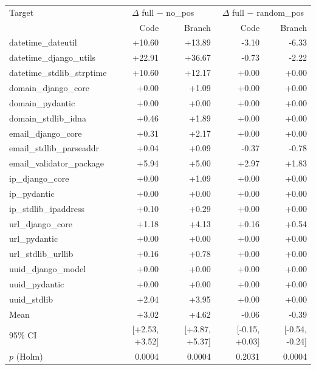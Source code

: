 \begin{tabular}{lrrrr}
\toprule
Target & \multicolumn{2}{c}{$\Delta$ full $-$ no\_pos} & \multicolumn{2}{c}{$\Delta$ full $-$ random\_pos} \\
 & Code & Branch & Code & Branch \\
\midrule
datetime\_dateutil & +10.60 & +13.89 & -3.10 & -6.33 \\
datetime\_django\_utils & +22.91 & +36.67 & -0.73 & -2.22 \\
datetime\_stdlib\_strptime & +10.60 & +12.17 & +0.00 & +0.00 \\
domain\_django\_core & +0.00 & +1.09 & +0.00 & +0.00 \\
domain\_pydantic & +0.00 & +0.00 & +0.00 & +0.00 \\
domain\_stdlib\_idna & +0.46 & +1.89 & +0.00 & +0.00 \\
email\_django\_core & +0.31 & +2.17 & +0.00 & +0.00 \\
email\_stdlib\_parseaddr & +0.04 & +0.09 & -0.37 & -0.78 \\
email\_validator\_package & +5.94 & +5.00 & +2.97 & +1.83 \\
ip\_django\_core & +0.00 & +1.09 & +0.00 & +0.00 \\
ip\_pydantic & +0.00 & +0.00 & +0.00 & +0.00 \\
ip\_stdlib\_ipaddress & +0.10 & +0.29 & +0.00 & +0.00 \\
url\_django\_core & +1.18 & +4.13 & +0.16 & +0.54 \\
url\_pydantic & +0.00 & +0.00 & +0.00 & +0.00 \\
url\_stdlib\_urllib & +0.16 & +0.78 & +0.00 & +0.00 \\
uuid\_django\_model & +0.00 & +0.00 & +0.00 & +0.00 \\
uuid\_pydantic & +0.00 & +0.00 & +0.00 & +0.00 \\
uuid\_stdlib & +2.04 & +3.95 & +0.00 & +0.00 \\
\midrule
Mean & +3.02 & +4.62 & -0.06 & -0.39 \\
95\% CI & [+2.53, +3.52] & [+3.87, +5.37] & [-0.15, +0.03] & [-0.54, -0.24] \\
$p$ (Holm) & 0.0004 & 0.0004 & 0.2031 & 0.0004 \\
\bottomrule
\end{tabular}
